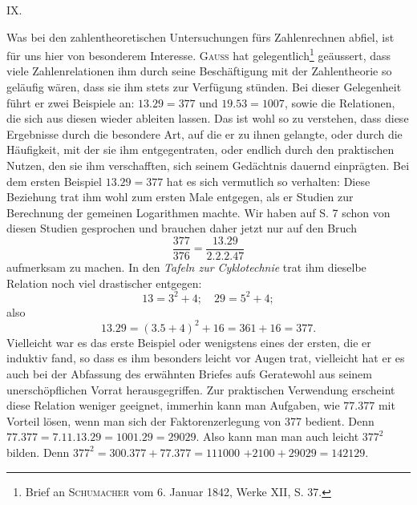 \clearpage\begingroup{}
\renewcommand{\thefootnote}{\arabic{footnote})}\setcounter{footnote}{0}
\begin{center}\large IX.\par{}\end{center}
\noindent\hspace*{\parindent}Was bei den zahlentheoretischen Untersuchungen fürs Zahlenrechnen
abfiel, ist für uns hier von besonderem Interesse. \textsc{Gauss} hat gelegentlich\footnote{Brief an \textsc{Schumacher} vom 6. Januar 1842, Werke XII, S. 37.}
geäussert, dass viele Zahlenrelationen ihm durch seine Beschäftigung mit der
Zahlentheorie so geläufig wären, dass sie ihm stets zur Verfügung stünden. Bei
dieser Gelegenheit führt er zwei Beispiele an: $13\mathord{.}29=377$ und $19\mathord{.}53=1007$,
\clearpage{}
\noindent sowie die Relationen, die sich aus diesen wieder ableiten lassen. Das ist
wohl so zu verstehen, dass diese Ergebnisse durch die besondere Art, auf die
er zu ihnen gelangte, oder durch die Häufigkeit, mit der sie ihm entgegentraten, oder endlich durch den praktischen Nutzen, den sie ihm verschafften,
sich seinem Gedächtnis dauernd einprägten. Bei dem ersten Beispiel $13\mathord{.}29=377$
hat es sich vermutlich so verhalten: Diese Beziehung trat ihm wohl zum ersten
Male entgegen, als er Studien zur Berechnung der gemeinen Logarithmen
machte. Wir haben auf S. 7 schon von diesen Studien gesprochen und
brauchen daher jetzt nur auf den Bruch
\[
\frac{377}{376}=\frac{13\mathord{.}29}{2\mathord{.}2\mathord{.}2\mathord{.}47}
\]
\noindent aufmerksam zu machen. In den \textit{Tafeln zur Cyklotechnie} trat ihm dieselbe
Relation noch viel drastischer entgegen:
\[
13=3^2+4;\quad 29=5^2+4;
\]
\noindent also
\[
13\mathord{.}29=(3\mathord{.}5+4)^2+16=361+16=377.
\]
\noindent Vielleicht war es das erste Beispiel oder wenigstens eines der ersten, die er
induktiv fand, so dass es ihm besonders leicht vor Augen trat, vielleicht hat
er es auch bei der Abfassung des erwähnten Briefes aufs Geratewohl aus
seinem unerschöpflichen Vorrat herausgegriffen. Zur praktischen Verwendung
erscheint diese Relation weniger geeignet, immerhin kann man Aufgaben, wie
$77\mathord{.}377$ mit Vorteil lösen, wenn man sich der Faktorenzerlegung von 377
bedient. Denn $77\mathord{.}377=7\mathord{.}11\mathord{.}13\mathord{.}29=1001\mathord{.}29=29029$. Also kann man
man auch leicht $377^2$ bilden. Denn $377^2=300\mathord{.}377+77\mathord{.}377=111000$
$+2100+29029=142129$.

